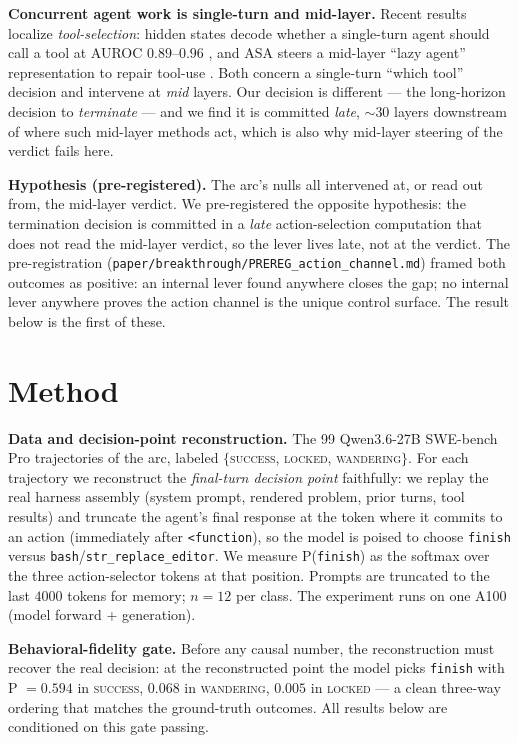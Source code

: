 \documentclass[11pt]{article}
\begin{document}
\textbf{Concurrent agent work is single-turn and mid-layer.} Recent results localize \emph{tool-selection}: hidden states decode whether a single-turn agent should call a tool at AUROC $0.89$--$0.96$ \cite{sun_tools}, and ASA steers a mid-layer ``lazy agent'' representation to repair tool-use \cite{asa}. Both concern a single-turn ``which tool'' decision and intervene at \emph{mid} layers. Our decision is different --- the long-horizon decision to \emph{terminate} --- and we find it is committed \emph{late}, $\sim$30 layers downstream of where such mid-layer methods act, which is also why mid-layer steering of the verdict fails here.

\textbf{Hypothesis (pre-registered).} The arc's nulls all intervened at, or read out from, the mid-layer verdict. We pre-registered the opposite hypothesis: the termination decision is committed in a \emph{late} action-selection computation that does not read the mid-layer verdict, so the lever lives late, not at the verdict. The pre-registration (\texttt{paper/breakthrough/PREREG\_action\_channel.md}) framed both outcomes as positive: an internal lever found anywhere closes the gap; no internal lever anywhere proves the action channel is the unique control surface. The result below is the first of these.

\section{Method}\label{sec:method}

\textbf{Data and decision-point reconstruction.} The 99 Qwen3.6-27B SWE-bench Pro trajectories of the arc, labeled $\{$\textsc{success}, \textsc{locked}, \textsc{wandering}$\}$. For each trajectory we reconstruct the \emph{final-turn decision point} faithfully: we replay the real harness assembly (system prompt, rendered problem, prior turns, tool results) and truncate the agent's final response at the token where it commits to an action (immediately after \texttt{<function}), so the model is poised to choose \texttt{finish} versus \texttt{bash}/\texttt{str\_replace\_editor}. We measure P(\texttt{finish}) as the softmax over the three action-selector tokens at that position. Prompts are truncated to the last $4000$ tokens for memory; $n=12$ per class. The experiment runs on one A100 (model forward + generation).

\textbf{Behavioral-fidelity gate.} Before any causal number, the reconstruction must recover the real decision: at the reconstructed point the model picks \texttt{finish} with P $=0.594$ in \textsc{success}, $0.068$ in \textsc{wandering}, $0.005$ in \textsc{locked} --- a clean three-way ordering that matches the ground-truth outcomes. All results below are conditioned on this gate passing.
\end{document}
